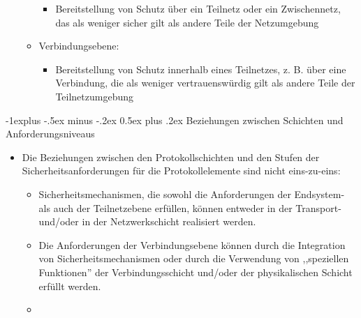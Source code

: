 \documentclass[a4paper]{article}
\makeatletter
\renewcommand{\subsection}{\@startsection{subsection}{2}{0mm}%
 {-1explus -.5ex minus -.2ex}%
 {0.5ex plus .2ex}%
 {\normalfont\normalsize\bfseries}}
\makeatother
\begin{document}
\begin{multicols}{3}
\begin{itemize}
\begin{itemize}
                        \begin{itemize}
                            \item
                                  Bereitstellung von Schutz über ein Teilnetz oder ein Zwischennetz,
                                  das als weniger sicher gilt als andere Teile der Netzumgebung
                        \end{itemize}
                  \item
                        Verbindungsebene:

                        \begin{itemize}
                            \item
                                  Bereitstellung von Schutz innerhalb eines Teilnetzes, z. B. über
                                  eine Verbindung, die als weniger vertrauenswürdig gilt als andere
                                  Teile der Teilnetzumgebung
                        \end{itemize}
              \end{itemize}
    \end{itemize}


    \subsection{Beziehungen zwischen Schichten und
        Anforderungsniveaus}

    \begin{itemize}
        \item
              Die Beziehungen zwischen den Protokollschichten und den Stufen der
              Sicherheitsanforderungen für die Protokollelemente sind nicht
              eins-zu-eins:

              \begin{itemize}
                  \item
                        Sicherheitsmechanismen, die sowohl die Anforderungen der Endsystem-
                        als auch der Teilnetzebene erfüllen, können entweder in der
                        Transport- und/oder in der Netzwerkschicht realisiert werden.
                  \item
                        Die Anforderungen der Verbindungsebene können durch die Integration
                        von Sicherheitsmechanismen oder durch die Verwendung von
                        ,,speziellen Funktionen'' der Verbindungsschicht und/oder der
                        physikalischen Schicht erfüllt werden.
                  \item
              \end{itemize}
    \end{itemize}



\end{multicols}
\end{document}
